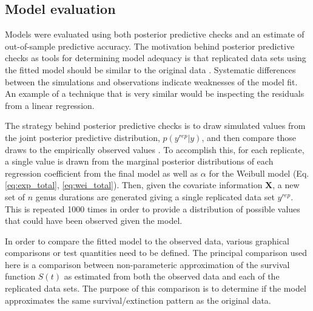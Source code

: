 \documentclass[12pt,letterpaper]{article}
\begin{document}
\subsection{Model evaluation}

Models were evaluated using both posterior predictive checks and an estimate of out-of-sample predictive accuracy. The motivation behind posterior predictive checks as tools for determining model adequacy is that replicated data sets using the fitted model should be similar to the original data \citep{Gelman2013d}. Systematic differences between the simulations and observations indicate weaknesses of the model fit. An example of a technique that is very similar would be inspecting the residuals from a linear regression.

The strategy behind posterior predictive checks is to draw simulated values from the joint posterior predictive distribution, \(p(y^{rep} | y)\), and then compare those draws to the empirically observed values \citep{Gelman2013d}. To accomplish this, for each replicate, a single value is drawn from the marginal posterior distributions of each regression coefficient from the final model as well as \(\alpha\) for the Weibull model (Eq. \ref{eq:exp_total}, \ref{eq:wei_total}). Then, given the covariate information \(\mathbf{X}\), a new set of \(n\) genus durations are generated giving a single replicated data set \(y^{rep}\). This is repeated 1000 times in order to provide a distribution of possible values that could have been observed given the model. 

In order to compare the fitted model to the observed data, various graphical comparisons or test quantities need to be defined. The principal comparison used here is a comparison between non-parameteric approximation of the survival function \(S(t)\) as estimated from both the observed data and each of the replicated data sets. The purpose of this comparison is to determine if the model approximates the same survival/extinction pattern as the original data. 
\end{document}
